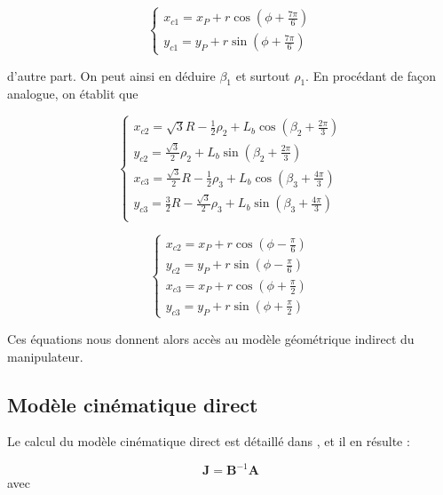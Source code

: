 \documentclass{article}
\begin{document}
\begin{multicols*}{2}
\begin{equation}
    \begin{cases}
        x_{c1} = x_P + r \cos{(\phi + \frac{7\pi}{6})}\\
        y_{c1} = y_P + r \sin{(\phi + \frac{7\pi}{6})}
    \end{cases}
\end{equation}

d'autre part. On peut ainsi en déduire $\beta_1$ et surtout $\rho_1$. En procédant de façon analogue, on établit que

\begin{equation}
    \begin{cases}
    x_{c2} = \sqrt{3} R-\frac{1}{2}\rho_2 + L_b \cos{\left(\beta_2+\frac{2 \pi}{3}\right)}\\
    y_{c2} = \frac{\sqrt{3}}{2} \rho_2+ L_b \sin{\left(\beta_2+\frac{2 \pi}{3} \right)} \\
    x_{c3} =  \frac{\sqrt{3}}{2} R-\frac{1}{2}\rho_3 + L_b \cos{\left(\beta_3+\frac{4 \pi}{3}\right)}\\
    y_{c3} =  \frac{3}{2}R-\frac{\sqrt{3}}{2} \rho_3+ L_b \sin{\left(\beta_3+\frac{4 \pi}{3} \right)} \\
    \end{cases}
\end{equation}

\begin{equation}
    \begin{cases}
        x_{c2} = x_P + r \cos{(\phi - \frac{\pi}{6})}\\
        y_{c2} = y_P + r \sin{(\phi - \frac{\pi}{6})}\\
        x_{c3} = x_P + r \cos{(\phi + \frac{\pi}{2})}\\
        y_{c3} = y_P + r \sin{(\phi + \frac{\pi}{2})}
    \end{cases}
\end{equation}

Ces équations nous donnent alors accès au modèle géométrique indirect du manipulateur.

\subsection*{Modèle cinématique direct}

Le calcul du modèle cinématique direct est détaillé dans \cite{caro11}, et il en résulte :

\begin{equation}
    \mathbf{J}= \mathbf{B}^{-1} \mathbf{A}
    \label{jacobian}
\end{equation}
avec


\end{multicols*}
\end{document}
